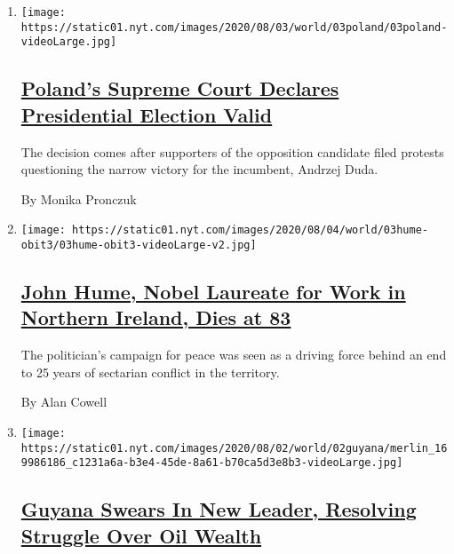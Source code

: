 \begin{enumerate}
\def\labelenumi{\arabic{enumi}.}
\item
  \texttt{[image: https://static01.nyt.com/images/2020/08/03/world/03poland/03poland-videoLarge.jpg]}

  \hypertarget{polands-supreme-court-declares-presidential-election-valid}{%
  \subsection{\texorpdfstring{\href{/2020/08/03/world/europe/poland-court-presidential-election.html}{Poland's
  Supreme Court Declares Presidential Election
  Valid}}{Poland's Supreme Court Declares Presidential Election Valid}}\label{polands-supreme-court-declares-presidential-election-valid}}

  The decision comes after supporters of the opposition candidate filed
  protests questioning the narrow victory for the incumbent, Andrzej
  Duda.

  By Monika Pronczuk
\item
  \texttt{[image: https://static01.nyt.com/images/2020/08/04/world/03hume-obit3/03hume-obit3-videoLarge-v2.jpg]}

  \hypertarget{john-hume-nobel-laureate-for-work-in-northern-ireland-dies-at-83}{%
  \subsection{\texorpdfstring{\href{/2020/08/03/obituaries/john-hume-dies.html}{John
  Hume, Nobel Laureate for Work in Northern Ireland, Dies at
  83}}{John Hume, Nobel Laureate for Work in Northern Ireland, Dies at 83}}\label{john-hume-nobel-laureate-for-work-in-northern-ireland-dies-at-83}}

  The politician's campaign for peace was seen as a driving force behind
  an end to 25 years of sectarian conflict in the territory.

  By Alan Cowell
\item
  \texttt{[image: https://static01.nyt.com/images/2020/08/02/world/02guyana/merlin\_169986186\_c1231a6a-b3e4-45de-8a61-b70ca5d3e8b3-videoLarge.jpg]}

  \hypertarget{guyana-swears-in-new-leader-resolving-struggle-over-oil-wealth}{%
  \subsection{\texorpdfstring{\href{/2020/08/02/world/americas/guyana-president-ali-oil.html}{Guyana
  Swears In New Leader, Resolving Struggle Over Oil
  Wealth}}{Guyana Swears In New Leader, Resolving Struggle Over Oil Wealth}}\label{guyana-swears-in-new-leader-resolving-struggle-over-oil-wealth}}


\end{enumerate}
